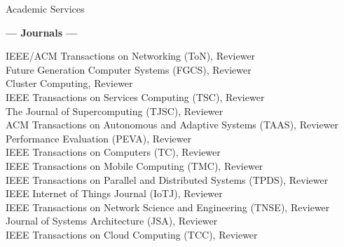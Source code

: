 \documentclass{resume} %
\begin{document}
\begin{rSection}{Academic Services}
{{\large \textbf{--- Journals ---}}
\vspace{-0.5em}

IEEE/ACM Transactions on Networking (ToN), Reviewer \\
Future Generation Computer Systems (FGCS), Reviewer \\
Cluster Computing, Reviewer \\
IEEE Transactions on Services Computing (TSC), Reviewer \\
The Journal of Supercomputing (TJSC), Reviewer \\
ACM Transactions on Autonomous and Adaptive Systems (TAAS), Reviewer \\
Performance Evaluation (PEVA), Reviewer \\
IEEE Transactions on Computers (TC), Reviewer \\
IEEE Transactions on Mobile Computing (TMC), Reviewer \\
IEEE Transactions on Parallel and Distributed Systems (TPDS), Reviewer \\
IEEE Internet of Things Journal (IoTJ), Reviewer \\
IEEE Transactions on Network Science and Engineering (TNSE), Reviewer \\
Journal of Systems Architecture (JSA), Reviewer \\
IEEE Transactions on Cloud Computing (TCC), Reviewer \\
}

\end{rSection}






\end{document}
